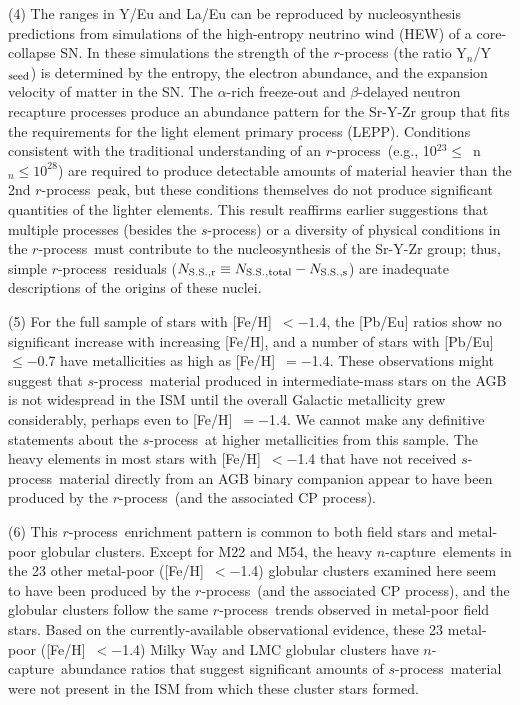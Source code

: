 \documentclass{emulateapj}
\def\rpro{\mbox{$r$-process}}
\def\spro{\mbox{$s$-process}}
\def\ncap{\mbox{$n$-capture}}
\begin{document}
(4)
The ranges in Y/Eu and La/Eu can be reproduced by 
nucleosynthesis predictions from simulations of the high-entropy neutrino
wind (HEW) of a core-collapse SN.
In these simulations the strength of the $r$-process 
(the ratio Y$_n$/Y$_{\rm seed}$)
is determined by the entropy, the electron abundance,
and the expansion velocity of matter in the SN.
The $\alpha$-rich freeze-out and $\beta$-delayed neutron recapture processes 
produce an abundance pattern for the Sr-Y-Zr group
that fits the requirements for the light element primary process (LEPP).
Conditions consistent with the traditional understanding of
an \rpro\ (e.g., 10$^{23} \leq$~n$_{n} \leq 10^{28}$)
are required to produce detectable
amounts of material heavier than the 2nd \rpro\ peak, but 
these conditions themselves do not produce 
significant quantities of the lighter elements.
This result reaffirms earlier suggestions
that multiple
processes (besides the \spro) or a diversity of physical conditions
in the \rpro\ must contribute to the nucleosynthesis of the 
Sr-Y-Zr group; thus, simple \rpro\ residuals 
($N_{\rm S.S., r} \equiv N_{\rm S.S., total} - N_{\rm S.S., s}$)
are inadequate descriptions of the origins of these nuclei.

(5)
For the full sample of stars with [Fe/H]~$< -1.4$,
the [Pb/Eu] ratios show no significant increase 
with increasing [Fe/H], and a number of stars with 
[Pb/Eu]~$\leq -$0.7 have metallicities as high as
[Fe/H]~$= -$1.4.
These observations might suggest
that \spro\ material produced in intermediate-mass stars on the AGB
is not widespread in the ISM until the overall
Galactic metallicity grew considerably, perhaps even to 
[Fe/H]~$= -$1.4.
We cannot make any definitive statements about the \spro\
at higher metallicities from this sample.
The heavy elements in 
most stars with [Fe/H]~$< -$1.4 that have not received \spro\ material 
directly from an AGB binary companion
appear to have been produced by the \rpro\ 
(and the associated CP process).

(6)
This \rpro\ enrichment pattern is common to both field stars and
metal-poor globular clusters.
Except for M22 and M54, the heavy \ncap\ elements in the 
23 other metal-poor
([Fe/H]~$< -$1.4) globular clusters examined here 
seem to have been produced by the \rpro\ 
(and the associated CP process), 
and the globular clusters follow the same
\rpro\ trends observed in metal-poor field stars.
Based on the currently-available observational evidence, 
these 23 metal-poor ([Fe/H]~$< -$1.4) Milky Way and LMC globular clusters
have \ncap\ abundance ratios that suggest significant amounts of \spro\ 
material were not present in the ISM from which these cluster stars formed.
\end{document}
